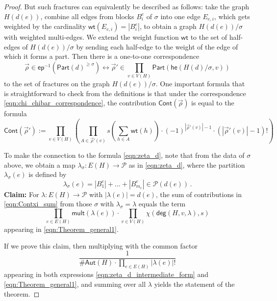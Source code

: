 \documentclass[authorcolumns,numberwithinsect]{no-lipics-v2022}
\newcommand{\he}{\mathsf{he}}
\begin{document}
\begin{proof}
But such fractures can equivalently be described as follows: take the graph $H(d(e))$, combine all edges from blocks $B_i^e$ of $\sigma$ into one edge $E_{e,i}$, which gets weighted by the cardinality $\mathsf{wt}(E_{e,i})=|B_i^e|$, to obtain a graph $H(d(e))/\sigma$ with weighted multi-edges. We extend the weight function $\mathsf{wt}$ to the set of half-edges of $H(d(e))/\sigma$ by sending each half-edge to the weight of the edge of which it forms a part.
Then there is a one-to-one correspondence
\begin{equation} \label{eqn:chi_chibar_correspondence}
\vec\rho \in\mathsf{ep}^{-1}(\mathsf{Part}(d)^{\geq \sigma})  \leftrightarrow \vec\rho' \in \prod_{v \in V(H)} \mathsf{Part}(\he(H(d)/\sigma, v))
\end{equation}
to the set of fractures on the graph $H(d(e))/\sigma$. One important formula that is straightforward to check from the definitions is that under the correspondence \eqref{eqn:chi_chibar_correspondence}, the contribution $\mathsf{Cont}(\vec\rho)$ is equal to the formula
\begin{equation}
\mathsf{Cont}(\vec\rho') := \prod_{v\in V(H)}\left(\prod_{A \in \vec\rho'(v)} s(\sum_{h \in A} \mathsf{wt}(h) ) \cdot (-1)^{|\vec\rho'(v)| -1} \cdot (|\vec\rho'(v)|-1)! \right)
\end{equation}

To make the connection to the formula \eqref{eqn:zeta_d}, note that from the data of $\sigma$ above, we obtain a map $\lambda_\sigma: E(H) \to \mathcal{P}$ as in \eqref{eqn:zeta_d}, where the partition $\lambda_\sigma(e)$ is defined by
\[
\lambda_\sigma(e) = |B_1^e| + \ldots + |B_{m_e}^e| \in \mathcal{P}(d(e))\,.
\]
\textbf{Claim:} For $\lambda: E(H) \to \mathcal{P}$ with $|\lambda(e)|=d(e)$, the sum of contributions in \eqref{eqn:Contxi_sum} from those $\sigma$ with $\lambda_\sigma = \lambda$ equals
the term
\begin{equation} \label{eqn:final_desired_form}
\prod_{e \in E(H)} \mathsf{mult}(\lambda(e)) \cdot   \prod_{v \in V(H)} \chi(\mathsf{deg}(H, v, \lambda), s)
\end{equation}
appearing in \eqref{eqn:Theorem_general1}.

If we prove this claim, then multiplying with the common factor
\[
\frac{1}{\#\mathsf{Aut}(H) \cdot \prod_{e \in E(H)} |\lambda(e)|!}
\]
appearing in both expressions \eqref{eqn:zeta_d_intermediate_form} and \eqref{eqn:Theorem_general1}, and summing over all $\lambda$ yields the statement of the theorem.


\end{proof}
\end{document}
